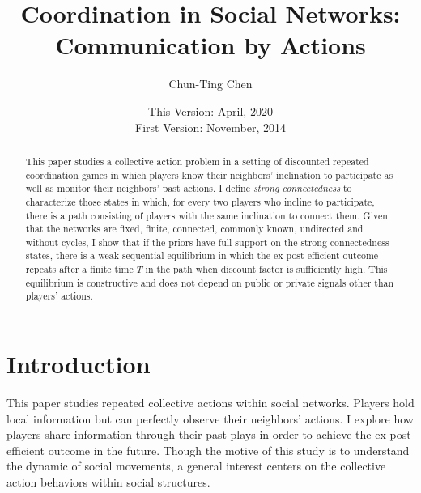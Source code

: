 \documentclass[12pt,letter]{article}
\theoremstyle{definition}
\theoremstyle{definition}
\theoremstyle{remark}
\theoremstyle{claim}
\begin{document}

\title {Coordination in Social Networks: Communication by Actions}
\author {Chun-Ting Chen}
\date{This Version: April, 2020\\
First Version: November, 2014\\ 
}
\maketitle

\begin{abstract}

This paper studies a collective action problem in a setting of discounted repeated coordination games in which players know their neighbors'  inclination to participate as well as monitor their neighbors' past actions. I define \textit{strong connectedness} to characterize those states in which, for every two players who incline to participate, there is a path consisting of players with the same inclination to connect them.  Given that the networks are fixed, finite, connected, commonly known, undirected and without cycles, I show that if the priors have full support on the strong connectedness states, there is a weak sequential equilibrium in which the ex-post efficient outcome repeats after a finite time $T$ in the path when discount factor is sufficiently high. This equilibrium is constructive and does not depend on public or private signals other than players' actions.




\end{abstract}


\section{Introduction} 

This paper studies repeated collective actions within social networks. Players hold local information but can perfectly observe their neighbors' actions. I explore how players share information through their past plays in order to achieve the ex-post efficient outcome in the future. Though the motive of this study is to understand the dynamic of social movements, a general interest centers on the collective action behaviors within social structures.
\end{document}
